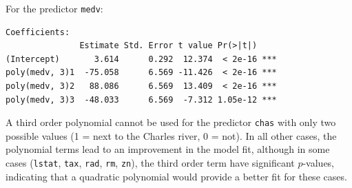 \begin{itemize}
        For the predictor \verb|medv|:
        \begin{lstlisting}
Coefficients:
               Estimate Std. Error t value Pr(>|t|)
(Intercept)       3.614      0.292  12.374  < 2e-16 ***
poly(medv, 3)1  -75.058      6.569 -11.426  < 2e-16 ***
poly(medv, 3)2   88.086      6.569  13.409  < 2e-16 ***
poly(medv, 3)3  -48.033      6.569  -7.312 1.05e-12 ***
        \end{lstlisting}

        A third order polynomial cannot be used for the predictor \verb|chas|
        with only two possible values (1 = next to the Charles river, 0 = not).
        In all other cases, the polynomial terms lead to an improvement in the
        model fit, although in some cases (\verb|lstat|, \verb|tax|,
        \verb|rad|, \verb|rm|, \verb|zn|), the third order term have
        significant $p$-values, indicating that a quadratic polynomial would
        provide a better fit for these cases.
\end{itemize}
